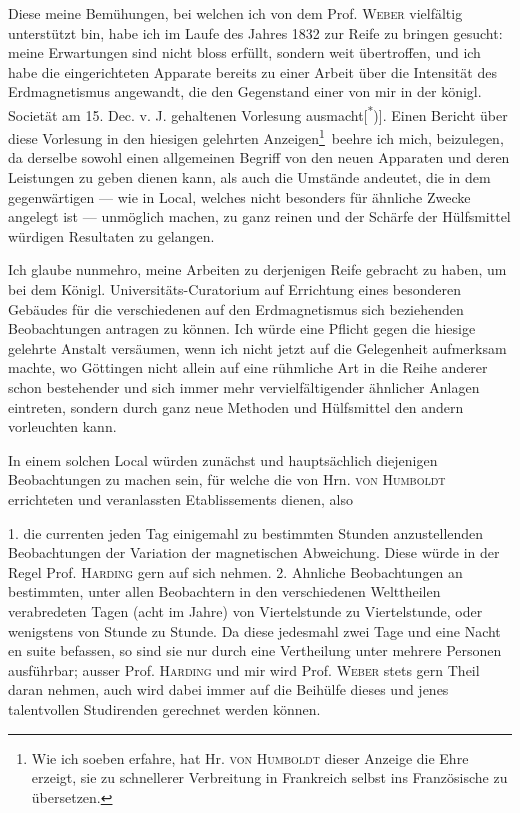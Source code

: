 Diese meine Bemühungen, bei welchen ich von dem Prof. \textsc{Weber} vielfältig
unterstützt bin, habe ich im Laufe des Jahres 1832 zur Reife zu bringen
gesucht: meine Erwartungen sind nicht bloss erfüllt, sondern weit übertroffen,
und ich habe die eingerichteten Apparate bereits zu einer Arbeit über die
Intensität des Erdmagnetismus angewandt, die den Gegenstand einer von mir
in der königl. Societät am 15. Dec. v. J. gehaltenen Vorlesung ausmacht[\textsuperscript{*})]\begingroup\renewcommand{\thefootnote}{}\endgroup.
Einen Bericht über diese Vorlesung in den hiesigen gelehrten Anzeigen\begingroup\renewcommand{\thefootnote}{**)}\footnote{Wie ich soeben erfahre, hat Hr. \textsc{von Humboldt} dieser Anzeige die Ehre erzeigt, sie zu schnellerer Verbreitung in Frankreich selbst ins Französische zu übersetzen.}\endgroup\ beehre
ich mich, beizulegen, da derselbe sowohl einen allgemeinen Begriff von
den neuen Apparaten und deren Leistungen zu geben dienen kann, als auch
die Umstände andeutet, die in dem gegenwärtigen --- wie in 
Local, welches nicht besonders für ähnliche Zwecke angelegt ist --- unmöglich
machen, zu ganz reinen und der Schärfe der Hülfsmittel würdigen Resultaten
zu gelangen.

Ich glaube nunmehro, meine Arbeiten zu derjenigen Reife gebracht zu
haben, um bei dem Königl. Universitäts-Curatorium auf Errichtung eines besonderen
Gebäudes für die verschiedenen auf den Erdmagnetismus sich beziehenden
Beobachtungen antragen zu können. Ich würde eine Pflicht gegen
die hiesige gelehrte Anstalt versäumen, wenn ich nicht jetzt auf die Gelegenheit
aufmerksam machte, wo Göttingen nicht allein auf eine rühmliche Art
in die Reihe anderer schon bestehender und sich immer mehr vervielfältigender
ähnlicher Anlagen eintreten, sondern durch ganz neue Methoden und Hülfsmittel
den andern vorleuchten kann.

In einem solchen Local würden zunächst und hauptsächlich diejenigen
Beobachtungen zu machen sein, für welche die von Hrn. \textsc{von Humboldt} errichteten
und veranlassten Etablissements dienen, also

1. die currenten jeden Tag einigemahl zu bestimmten Stunden anzustellenden
Beobachtungen der Variation der magnetischen Abweichung. Diese
würde in der Regel Prof. \textsc{Harding} gern auf sich nehmen.
\clearpage{}\HistoricalFoot{}{}
\noindent\hspace*{\parindent}2. Ahnliche Beobachtungen an bestimmten, unter allen Beobachtern in
den verschiedenen Welttheilen verabredeten Tagen (acht im Jahre) von Viertelstunde
zu Viertelstunde, oder wenigstens von Stunde zu Stunde. Da diese
jedesmahl zwei Tage und eine Nacht en suite befassen, so sind sie nur durch
eine Vertheilung unter mehrere Personen ausführbar; ausser Prof. \textsc{Harding}
und mir wird Prof. \textsc{Weber} stets gern Theil daran nehmen, auch wird dabei
immer auf die Beihülfe dieses und jenes talentvollen Studirenden gerechnet
werden können.

